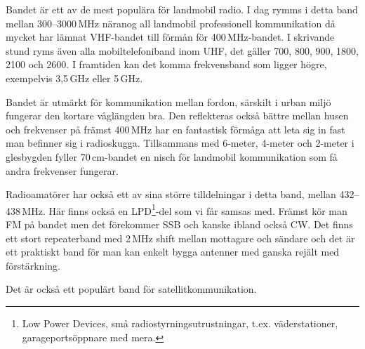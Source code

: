 Bandet är ett av de mest populära för landmobil radio. I dag rymms i detta band mellan 300--3000\,MHz näranog all landmobil professionell kommunikation då mycket har lämnat VHF-bandet till förmån för 400\,MHz-bandet. I skrivande stund ryms även alla mobiltelefoniband inom UHF, det gäller 700, 800, 900, 1800, 2100 och 2600. I framtiden kan det komma frekvensband som ligger högre, exempelvis 3,5\,GHz eller 5\,GHz.

Bandet är utmärkt för kommunikation mellan fordon, särskilt i urban miljö fungerar den kortare våglängden bra. Den reflekteras också bättre mellan husen och frekvenser på främst 400\,MHz har en fantastisk förmåga att leta sig in fast man befinner sig i radioskugga. Tillsammans med 6-meter, 4-meter och 2-meter i glesbygden fyller 70\,cm-bandet en nisch för landmobil kommunikation som få andra frekvenser fungerar.

Radioamatörer har också ett av sina större tilldelningar i detta band, mellan 432--438\,MHz. Här finns också en LPD\footnote{Low Power Devices, små radiostyrningsutrustningar, t.ex. väderstationer, garageportsöppnare med mera.}-del som vi får samsas med. Främst kör man FM på bandet men det förekommer SSB och kanske ibland också CW. Det finns ett stort repeaterband med 2\,MHz shift mellan mottagare och sändare och det är ett praktiskt band för man kan enkelt bygga antenner med ganska rejält med förstärkning.

Det är också ett populärt band för satellitkommunikation.
